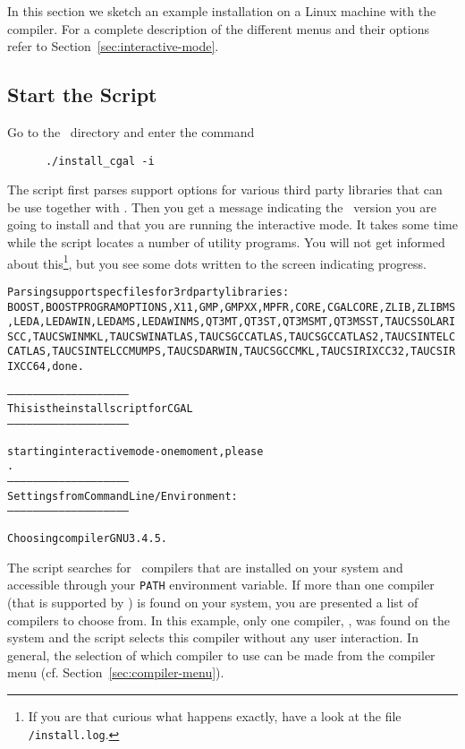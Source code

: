 In this section we sketch an example installation on a Linux machine
with the  compiler. For a complete description of the
different menus and their options refer to
Section~\ref{sec:interactive-mode}.

\subsection{Start the Script}

Go to the \cgaldir\ directory and enter the command
\begin{verbatim}
      ./install_cgal -i
\end{verbatim}

The script first parses support options for various third party
libraries that can be use together with \cgal. Then you get a message
indicating the \cgal\ version you are going to install and that you
are running the interactive mode. It takes some time while the script
locates a number of utility programs. You will not get informed about
this\footnote{If you are that curious what happens exactly, have a
  look at the file
  \texttt{\cgaldir/install.log}.}, but you see
some dots written to the screen indicating progress.

{\ccTexHtml{\scriptsize}{}
\begin{alltt}
Parsing support specfiles for 3rd party libraries:
BOOST, BOOSTPROGRAMOPTIONS, X11, GMP, GMPXX, MPFR, CORE, CGALCORE, ZLIB, ZLIBMS, LEDA, LEDAWIN, LEDAMS, LEDAWINMS, QT3MT, QT3ST, QT3MSMT, QT3MSST, TAUCSSOLARISCC, TAUCSWINMKL, TAUCSWINATLAS, TAUCSGCCATLAS, TAUCSGCCATLAS2, TAUCSINTELCCATLAS, TAUCSINTELCCMUMPS, TAUCSDARWIN, TAUCSGCCMKL, TAUCSIRIXCC32, TAUCSIRIXCC64, done.

--------------------------------------------------------
  This is the install script for CGAL \cgalrelease
--------------------------------------------------------

starting interactive mode - one moment, please
.
--------------------------------------------------------
Settings from Command Line/Environment:
--------------------------------------------------------

  Choosing compiler GNU 3.4.5.
\end{alltt}}

The script searches for \CC\ compilers that are installed on your
system and accessible through your \texttt{PATH} environment variable.
If more than one compiler (that is supported by \cgal) is found on
your system, you are presented a list of compilers to choose from. In
this example, only one compiler, , was found on the system
and the script selects this compiler without any user interaction. In
general, the selection of which compiler to use can be made from the
compiler menu (cf. Section~\ref{sec:compiler-menu}).

